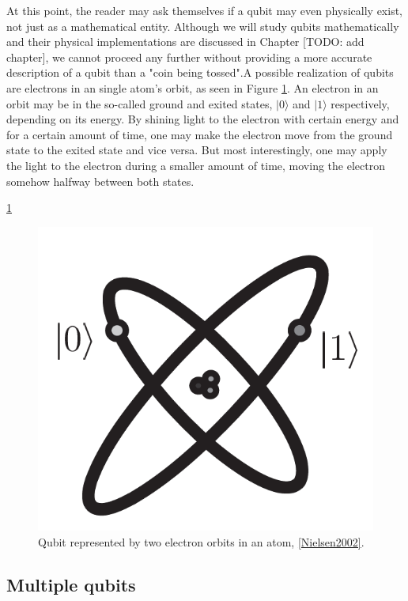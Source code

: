At this point, the reader may ask themselves if a qubit may even physically exist, not just as a mathematical entity. Although we will study qubits mathematically and their physical implementations are discussed in Chapter [TODO: add chapter], we cannot proceed any further without providing a more accurate description of a qubit than a "coin being tossed".A possible realization of qubits are electrons in an single atom's orbit, as seen in Figure \ref{fig 1.1}. An electron in an orbit may be in the so-called ground and exited states, $|0\rangle$ and $|1\rangle$ respectively, depending on its energy. By shining light to the electron with certain energy and for a certain amount of time, one may make the electron move from the ground state to the exited state and vice versa. But most interestingly, one may apply the light to the electron during a smaller amount of time, moving the electron somehow halfway between both states.


\ref{fig 1.1}

\begin{figure}[h]
	\includegraphics[scale=.4]{../imgs/atom.png}
	\centering
	\caption{Qubit represented by two electron orbits in an atom, \ref{Nielsen2002}.}
	\label{fig 1.1}
\end{figure}

\subsection{Multiple qubits}


